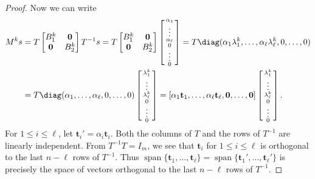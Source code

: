 \documentclass[11pt]{article}
\begin{document}
\begin{proof}
 Now we can write
 \begin{align*}
  M^k s
  &= T \begin{bmatrix} B_1^k & \mathbf{0} \\ \mathbf{0} & B_2^k \end{bmatrix} T^{-1} s
  = T \begin{bmatrix} B_1^k & \mathbf{0} \\ \mathbf{0} & B_2^k \end{bmatrix} \left[\begin{smallmatrix} \alpha_1 \\ \vdots \\ \alpha_\ell \\ 0 \\ \vdots \\ 0 \end{smallmatrix}\right]
  = T \diag(\alpha_1 \lambda_1^k, \dotsc, \alpha_\ell \lambda_\ell^k, 0, \dotsc, 0)\\
  &= T \diag(\alpha_1, \dotsc, \alpha_\ell, 0, \dotsc, 0) \left[\begin{smallmatrix} \lambda_1^k \\ \vdots \\ \lambda_\ell^k \\ 0 \\ \vdots \\ 0 \end{smallmatrix}\right]
  = [\alpha_1 \mathbf{t}_1, \dotsc, \alpha_\ell \mathbf{t}_\ell, \mathbf{0}, \dotsc, \mathbf{0}] \left[\begin{smallmatrix}  \lambda_1^k \\ \vdots \\ \lambda_\ell^k \\ 0 \\ \vdots \\ 0 \end{smallmatrix}\right].
 \end{align*}
 For $1 \le i \le \ell$,
 let $\mathbf{t}_i' = \alpha_i \mathbf{t}_i$.
 Both the columns of $T$ and the rows of $T^{-1}$ are linearly independent.
 From $T^{-1} T = I_m$,
 we see that $\mathbf{t}_i$ for $1 \le i \le \ell$ is orthogonal to the last $n - \ell$ rows of $T^{-1}$.
 Thus $\operatorname{span}\{\mathbf{t}_1, \dotsc, \mathbf{t}_\ell\} = \operatorname{span}\{\mathbf{t}_1', \dotsc, \mathbf{t}_\ell'\}$
 is precisely the space of vectors orthogonal to the last $n - \ell$ rows of $T^{-1}$.


\end{proof}
\end{document}
